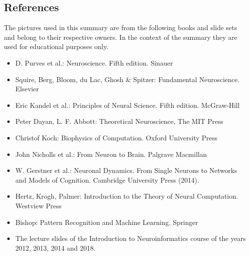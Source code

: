 \documentclass[a4paper, 12pt]{article}
\begin{document}
\subsection{References}
The pictures used in this summary are from the following books and slide sets
and belong to their respective owners. In the context of the summary they are
used for educational purposes only.
\begin{itemize}
\item D. Purves et al.: Neuroscience. Fifth edition. Sinauer

\item Squire, Berg, Bloom, du Lac, Ghosh \& Spitzer: Fundamental Neuroscience. Elsevier

\item Eric Kandel et al.: Principles of Neural Science. Fifth edition.
McGraw-Hill 

\item Peter Dayan, L. F. Abbott: Theoretical Neuroscience, The MIT
Press

\item Christof Koch: Biophysics of Computation. Oxford University Press

\item John Nicholls et al.: From Neuron to Brain. Palgrave Macmillan

\item W. Gerstner et al.: Neuronal Dynamics. From Single Neurons to Networks and Models of Cognition. Cambridge University Press (2014).

\item Hertz, Krogh, Palmer: Introduction to the Theory of Neural Computation.
Westview Press

\item Bishop: Pattern Recognition and Machine Learning. Springer

\item The lecture slides of the Introduction to Neuroinformatics course of the
years 2012, 2013, 2014 and 2018.

\end{itemize}
\end{document}
